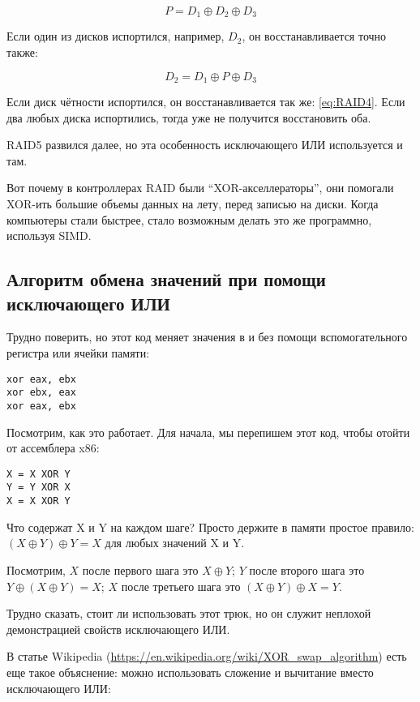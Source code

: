 \begin{equation} \label{eq:RAID4}
P = D_1 \oplus D_2 \oplus D_3
\end{equation}

Если один из дисков испортился, например, $D_2$, он восстанавливается точно также:

\begin{equation}
D_2 = D_1 \oplus P \oplus D_3
\end{equation}

Если диск чётности испортился, он восстанавливается так же: \ref{eq:RAID4}.
Если два любых диска испортились, тогда уже не получится восстановить оба.

\ac{RAID}5 развился далее, но эта особенность исключающего ИЛИ используется и там.

Вот почему в контроллерах \ac{RAID} были ``XOR-акселлераторы'', они помогали XOR-ить большие объемы данных
на лету, перед записью на диски.
Когда компьютеры стали быстрее, стало возможным делать это же программно, используя \ac{SIMD}.

\subsection{Алгоритм обмена значений при помощи исключающего ИЛИ}

Трудно поверить, но этот код меняет значения в \EAX и \EBX без помощи вспомогательного регистра или ячейки памяти:

\begin{lstlisting}[style=customasmx86]
xor eax, ebx
xor ebx, eax
xor eax, ebx
\end{lstlisting}

Посмотрим, как это работает.
Для начала, мы перепишем этот код, чтобы отойти от ассемблера x86:

\begin{lstlisting}
X = X XOR Y
Y = Y XOR X
X = X XOR Y
\end{lstlisting}

Что содержат X и Y на каждом шаге?
Просто держите в памяти простое правило: $(X \oplus Y) \oplus Y = X$ для любых значений X и Y.

Посмотрим,
$X$ после первого шага это $X \oplus Y$;
$Y$ после второго шага это $Y \oplus (X \oplus Y) = X$;
$X$ после третьего шага это $(X \oplus Y) \oplus X = Y$.

Трудно сказать, стоит ли использовать этот трюк, но он служит неплохой демонстрацией свойств исключающего ИЛИ.

В статье Wikipedia (\url{https://en.wikipedia.org/wiki/XOR_swap_algorithm}) есть еще такое объяснение:
можно использовать сложение и вычитание вместо исключающего ИЛИ:

